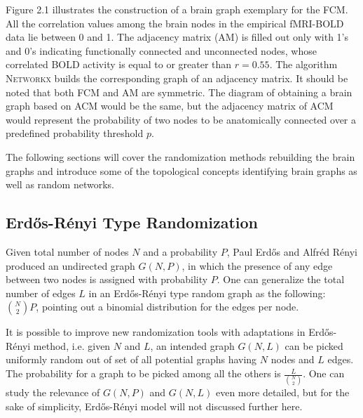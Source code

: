 Figure 2.1 illustrates the construction of a brain graph exemplary for the FCM. All the correlation values among the brain nodes in the empirical fMRI-BOLD data lie between 0 and 1. The adjacency matrix (AM) is filled out only with 1's and 0's indicating functionally connected and unconnected nodes, whose correlated BOLD activity is equal to or greater than $r=0.55$. The algorithm \textsc{Networkx} builds the corresponding graph of an adjacency matrix. It should be noted that both FCM and AM are symmetric. The diagram of obtaining a brain graph based on ACM would be the same, but the adjacency matrix of ACM would represent the probability of two nodes to be anatomically connected over a predefined probability threshold $p$. 

The following sections will cover the randomization methods rebuilding the brain graphs and introduce some of the topological concepts identifying brain graphs as well as random networks.

\subsection{Erd\H{o}s-R\'{e}nyi Type Randomization}

Given total number of nodes $N$ and a probability $P$, Paul Erd\H{o}s and Alfr\'{e}d R\'{e}nyi produced an undirected graph $G(N,P)$, in which the presence of any edge between two nodes is assigned with probability $P$. 
One can generalize the total number of edges $L$ in an  Erd\H{o}s-R\'{e}nyi type random graph as the following: $\binom {N} {2}P$, pointing out a binomial distribution for the edges per node.

It is possible to improve new randomization tools with adaptations in Erd\H{o}s-R\'{e}nyi method, i.e. given $N$ and $L$, an intended graph $G(N,L)$ can be picked uniformly random out of set of all potential graphs having $N$ nodes and $L$ edges. The probability for a graph to be picked among all the others is $\frac{L}{\binom {N}{2}}  $. One can study the relevance of $G(N,P)$ and $G(N,L)$ even more detailed, but for the sake of simplicity, Erd\H{o}s-R\'{e}nyi model will not discussed further here.

